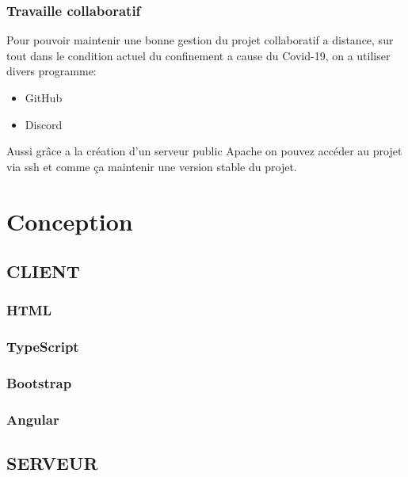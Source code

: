 \documentclass{article}
\begin{document}
\subsubsection{Travaille collaboratif}
Pour pouvoir maintenir une bonne gestion du projet collaboratif a distance, sur tout dans le condition actuel du confinement a cause du Covid-19, on a utiliser divers programme:
\begin{itemize}
\item GitHub
\item Discord
\end{itemize}
Aussi grâce a la création d'un serveur public Apache on pouvez accéder au projet via ssh et comme ça maintenir une version stable du projet.
\section{Conception}
\subsection{CLIENT}
\subsubsection{HTML}
\subsubsection{TypeScript} 
\subsubsection{Bootstrap}
\subsubsection{Angular}
\subsection{SERVEUR}
\end{document}
